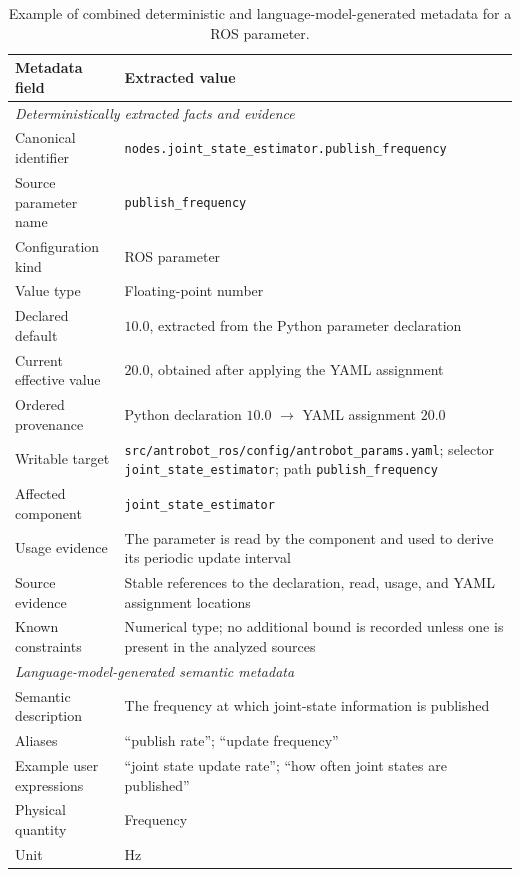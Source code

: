 \begin{table}[htbp]
\centering
\caption{Example of combined deterministic and language-model-generated metadata for a ROS parameter.}
\label{tab:deterministic-parameter-metadata}
\begin{tabular}{p{} p{}}
\hline
\textbf{Metadata field} & \textbf{Extracted value} \\
\hline
\multicolumn{2}{l}{\textit{Deterministically extracted facts and evidence}} \\
Canonical identifier & \texttt{nodes.joint\_state\_estimator.publish\_frequency} \\
Source parameter name & \texttt{publish\_frequency} \\
Configuration kind & ROS parameter \\
Value type & Floating-point number \\
Declared default & \(10.0\), extracted from the Python parameter declaration \\
Current effective value & \(20.0\), obtained after applying the YAML assignment \\
Ordered provenance & Python declaration \(10.0\) $\rightarrow$ YAML assignment \(20.0\) \\
Writable target & \texttt{src/antrobot\_ros/config/antrobot\_params.yaml}; selector \texttt{joint\_state\_estimator}; path \texttt{publish\_frequency} \\
Affected component & \texttt{joint\_state\_estimator} \\
Usage evidence & The parameter is read by the component and used to derive its periodic update interval \\
Source evidence & Stable references to the declaration, read, usage, and YAML assignment locations \\
Known constraints & Numerical type; no additional bound is recorded unless one is present in the analyzed sources \\
\hline
\multicolumn{2}{l}{\textit{Language-model-generated semantic metadata}} \\
Semantic description & The frequency at which joint-state information is published \\
Aliases & ``publish rate''; ``update frequency'' \\
Example user expressions & ``joint state update rate''; ``how often joint states are published'' \\
Physical quantity & Frequency \\
Unit & Hz \\

\end{tabular}
\end{table}
